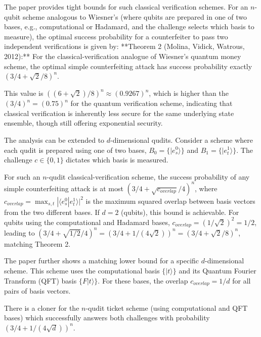 \documentclass{article} %
\begin{document}
The paper provides tight bounds for such classical verification schemes.
For an $n$-qubit scheme analogous to Wiesner's (where qubits are prepared in one of two bases, e.g., computational or Hadamard, and the challenge selects which basis to measure), the optimal success probability for a counterfeiter to pass two independent verifications is given by:
**Theorem 2 (Molina, Vidick, Watrous, 2012):** For the classical-verification analogue of Wiesner's quantum money scheme, the optimal simple counterfeiting attack has success probability exactly $(3/4 + \sqrt{2}/8)^n$.

This value is $( (6+\sqrt{2})/8 )^n \approx (0.9267)^n$, which is higher than the $(3/4)^n = (0.75)^n$ for the quantum verification scheme, indicating that classical verification is inherently less secure for the same underlying state ensemble, though still offering exponential security.

The analysis can be extended to $d$-dimensional qudits. Consider a scheme where each qudit is prepared using one of two bases, $B_0 = \{|e_s^0\rangle\}$ and $B_1 = \{|e_t^1\rangle\}$. The challenge $c \in \{0,1\}$ dictates which basis is measured.
\begin{tcolorbox}[
    skin=freelance,
    title={Lemma 5 (Molina, Vidick, Watrous, 2012)}
]
    
For such an $n$-qudit classical-verification scheme, the success probability of any simple counterfeiting attack is at most $(3/4 + \sqrt{c_{overlap}}/4)^n$, where $c_{overlap} = \max_{s,t} |\langle e_s^0 | e_t^1 \rangle|^2$ is the maximum squared overlap between basis vectors from the two different bases. If $d=2$ (qubits), this bound is achievable. For qubits using the computational and Hadamard bases, $c_{overlap} = (1/\sqrt{2})^2 = 1/2$, leading to $(3/4 + \sqrt{1/2}/4)^n = (3/4 + 1/(4\sqrt{2}))^n = (3/4 + \sqrt{2}/8)^n$, matching Theorem 2.
\end{tcolorbox}

The paper further shows a matching lower bound for a specific $d$-dimensional scheme. This scheme uses the computational basis $\{|t\rangle\}$ and its Quantum Fourier Transform (QFT) basis $\{F|t\rangle\}$. For these bases, the overlap $c_{overlap} = 1/d$ for all pairs of basis vectors.

\begin{tcolorbox}[
    skin=freelance,
    title={Lemma 6 (Molina, Vidick, Watrous, 2012)}
]

There is a cloner for the $n$-qudit ticket scheme (using computational and QFT bases) which successfully answers both challenges with probability $(3/4 + 1/(4\sqrt{d}))^n$.
\end{tcolorbox}
\end{document}
